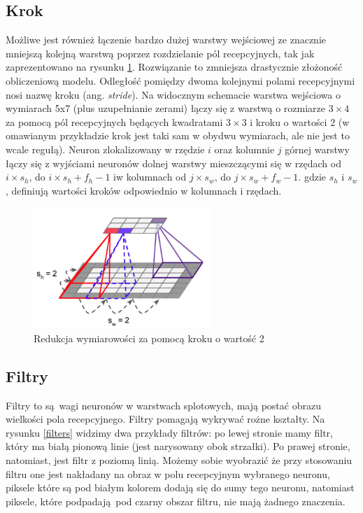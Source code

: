 \documentclass{article}
\begin{document}
\subsection{Krok}
Możliwe jest również łączenie bardzo dużej warstwy wejściowej ze znacznie mniejszą kolejną warstwą poprzez rozdzielanie pól recepcyjnych, tak jak zaprezentowano na rysunku \ref{step}. Rozwiązanie to zmniejsza drastycznie złożoność obliczeniową modelu. Odległość pomiędzy dwoma kolejnymi polami recepcyjnymi nosi nazwę kroku (ang. \textit{stride}). Na widocznym schemacie warstwa wejściowa o wymiarach 5x7 (plus uzupełnianie zerami) łączy się z warstwą o rozmiarze $3 \times 4$ za pomocą pól recepcyjnych będących kwadratami $3 \times 3$ i kroku o wartości 2 (w omawianym przykładzie krok jest taki sam w obydwu wymiarach, ale nie jest to wcale regułą). Neuron zlokalizowany w rzędzie $i$ oraz kolumnie $j$ górnej warstwy łączy się z wyjściami neuronów dolnej warstwy mieszczącymi się w rzędach od $i\times s_{h}$, do $i \times s_{h}+f_{h}-1$ iw kolumnach od $j \times s_{w}$, do $j \times s_{w}+f_{w}-1$. gdzie $s_{h}$ i $s_{w}$, definiują wartości kroków odpowiednio w kolumnach i rzędach. \cite{geron}
\begin{figure}[H]
	\centering
	\includegraphics[width=0.6\textwidth,keepaspectratio=true]{step}
	\caption{Redukcja wymiarowości za pomocą kroku o wartość 2 \cite{geron}}
	\label{step}
\end{figure}


\subsection{Filtry}
Filtry to są wagi neuronów w warstwach splotowych, mają postać obrazu wielkości pola recepcyjnego. Filtry pomagają wykrywać rożne kształty. Na rysunku \ref{filters} widzimy dwa przykłady filtrów: po lewej stronie mamy filtr, który ma białą pionową linie (jest narysowany obok strzałki). Po prawej stronie, natomiast, jest filtr z poziomą linią. Możemy sobie wyobrazić że przy stosowaniu filtru one jest nakładany na obraz w polu recepcyjnym wybranego neuronu, piksele które są pod białym kolorem dodają się do sumy tego neuronu, natomiast piksele, które podpadają pod czarny obszar filtru, nie mają żadnego znaczenia. 
\end{document}
